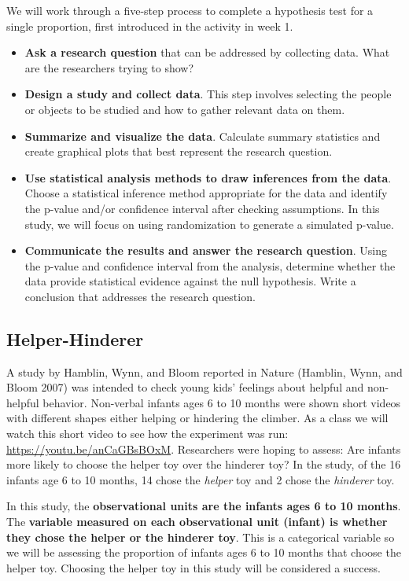 \documentclass[
]{report}
\begin{document}
We will work through a five-step process to complete a hypothesis test for a single proportion, first introduced in the activity in week 1.

\begin{itemize}
\item
  \textbf{Ask a research question} that can be addressed by collecting data. What are the researchers trying to show?
\item
  \textbf{Design a study and collect data}. This step involves selecting the people or objects to be studied and how to gather relevant data on them.
\item
  \textbf{Summarize and visualize the data}. Calculate summary statistics and create graphical plots that best represent the research question.
\item
  \textbf{Use statistical analysis methods to draw inferences from the data}. Choose a statistical inference method appropriate for the data and identify the p-value and/or confidence interval after checking assumptions. In this study, we will focus on using randomization to generate a simulated p-value.
\item
  \textbf{Communicate the results and answer the research question}. Using the p-value and confidence interval from the analysis, determine whether the data provide statistical evidence against the null hypothesis. Write a conclusion that addresses the research question.
\end{itemize}

\newpage

\subsection{Helper-Hinderer}\label{helper-hinderer}

A study by Hamblin, Wynn, and Bloom reported in Nature (Hamblin, Wynn, and Bloom 2007) was intended to check young kids' feelings about helpful and non-helpful behavior. Non-verbal infants ages 6 to 10 months were shown short videos with different shapes either helping or hindering the climber. As a class we will watch this short video to see how the experiment was run: \url{https://youtu.be/anCaGBsBOxM}. Researchers were hoping to assess: Are infants more likely to choose the helper toy over the hinderer toy? In the study, of the 16 infants age 6 to 10 months, 14 chose the \emph{helper} toy and 2 chose the \emph{hinderer} toy.

In this study, the \textbf{observational units are the infants ages 6 to 10 months}. The \textbf{variable measured on each observational unit (infant) is whether they chose the helper or the hinderer toy}. This is a categorical variable so we will be assessing the proportion of infants ages 6 to 10 months that choose the helper toy. Choosing the helper toy in this study will be considered a success.
\end{document}
